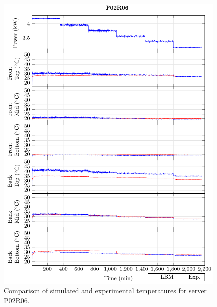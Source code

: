 \begin{figure}[!htb]
\centering
\includegraphics[width=\linewidth]{Plots/P02R06_T.pdf}
\caption{Comparison of simulated and experimental temperatures for server P02R06.}
\label{fig:P02R06_plot}
\end{figure}

\clearpage

